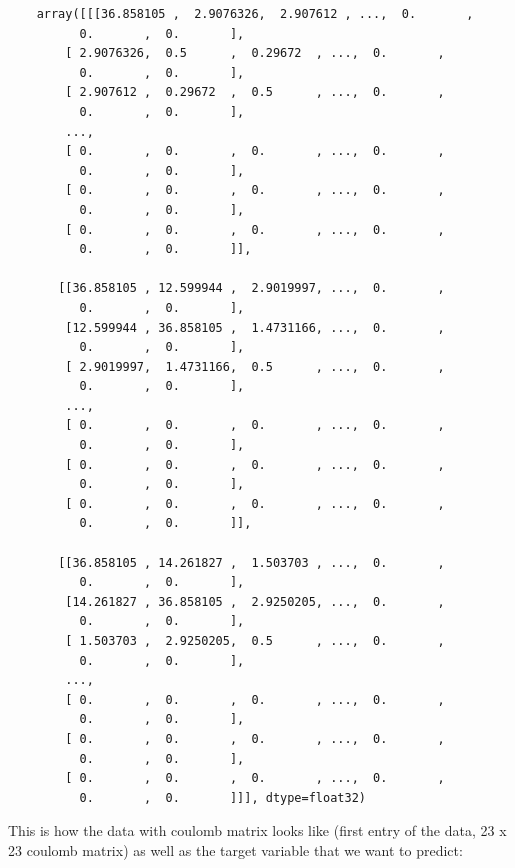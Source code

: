 \documentclass[a4paper,oneside,openright,11pt]{book}
\begin{document}
\begin{verbatim}
    array([[[36.858105 ,  2.9076326,  2.907612 , ...,  0.       ,
          0.       ,  0.       ],
        [ 2.9076326,  0.5      ,  0.29672  , ...,  0.       ,
          0.       ,  0.       ],
        [ 2.907612 ,  0.29672  ,  0.5      , ...,  0.       ,
          0.       ,  0.       ],
        ...,
        [ 0.       ,  0.       ,  0.       , ...,  0.       ,
          0.       ,  0.       ],
        [ 0.       ,  0.       ,  0.       , ...,  0.       ,
          0.       ,  0.       ],
        [ 0.       ,  0.       ,  0.       , ...,  0.       ,
          0.       ,  0.       ]],

       [[36.858105 , 12.599944 ,  2.9019997, ...,  0.       ,
          0.       ,  0.       ],
        [12.599944 , 36.858105 ,  1.4731166, ...,  0.       ,
          0.       ,  0.       ],
        [ 2.9019997,  1.4731166,  0.5      , ...,  0.       ,
          0.       ,  0.       ],
        ...,
        [ 0.       ,  0.       ,  0.       , ...,  0.       ,
          0.       ,  0.       ],
        [ 0.       ,  0.       ,  0.       , ...,  0.       ,
          0.       ,  0.       ],
        [ 0.       ,  0.       ,  0.       , ...,  0.       ,
          0.       ,  0.       ]],

       [[36.858105 , 14.261827 ,  1.503703 , ...,  0.       ,
          0.       ,  0.       ],
        [14.261827 , 36.858105 ,  2.9250205, ...,  0.       ,
          0.       ,  0.       ],
        [ 1.503703 ,  2.9250205,  0.5      , ...,  0.       ,
          0.       ,  0.       ],
        ...,
        [ 0.       ,  0.       ,  0.       , ...,  0.       ,
          0.       ,  0.       ],
        [ 0.       ,  0.       ,  0.       , ...,  0.       ,
          0.       ,  0.       ],
        [ 0.       ,  0.       ,  0.       , ...,  0.       ,
          0.       ,  0.       ]]], dtype=float32)
\end{verbatim}


This is how the data with coulomb matrix looks like (first entry of the data, 23 x 23 coulomb matrix) as well as the target variable that we want to predict:
\end{document}
